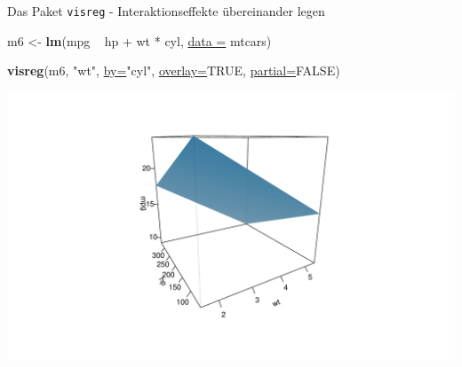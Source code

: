 \documentclass[
  ignorenonframetext,
]{beamer}
\newenvironment{Shaded}{\begin{snugshade}}{\end{snugshade}}
\newcommand{\DataTypeTok}[1]{\textcolor[rgb]{0.74,0.68,0.62}{\underline{#1}}}
\newcommand{\KeywordTok}[1]{\textcolor[rgb]{0.26,0.66,0.93}{\textbf{#1}}}
\newcommand{\NormalTok}[1]{\textcolor[rgb]{0.74,0.68,0.62}{#1}}
\newcommand{\OperatorTok}[1]{\textcolor[rgb]{0.74,0.68,0.62}{#1}}
\newcommand{\OtherTok}[1]{\textcolor[rgb]{0.74,0.68,0.62}{#1}}
\newcommand{\StringTok}[1]{\textcolor[rgb]{0.02,0.61,0.04}{#1}}
\begin{document}
\begin{frame}[fragile]{Das Paket \texttt{visreg} - Interaktionseffekte
übereinander legen}
\protect\hypertarget{das-paket-visreg---interaktionseffekte-ubereinander-legen}{}

\begin{Shaded}
\begin{Highlighting}[]
\NormalTok{m6 <-}\StringTok{ }\KeywordTok{lm}\NormalTok{(mpg }\OperatorTok{~}\StringTok{ }\NormalTok{hp }\OperatorTok{+}\StringTok{ }\NormalTok{wt }\OperatorTok{*}\StringTok{ }\NormalTok{cyl, }\DataTypeTok{data =}\NormalTok{ mtcars)}
\end{Highlighting}
\end{Shaded}

\begin{Shaded}
\begin{Highlighting}[]
\KeywordTok{visreg}\NormalTok{(m6, }\StringTok{"wt"}\NormalTok{, }\DataTypeTok{by=}\StringTok{"cyl"}\NormalTok{, }\DataTypeTok{overlay=}\OtherTok{TRUE}\NormalTok{, }\DataTypeTok{partial=}\OtherTok{FALSE}\NormalTok{)}
\end{Highlighting}
\end{Shaded}

\includegraphics{LineareRegression_files/figure-beamer/unnamed-chunk-47-1.pdf}

\end{frame}
\end{document}
